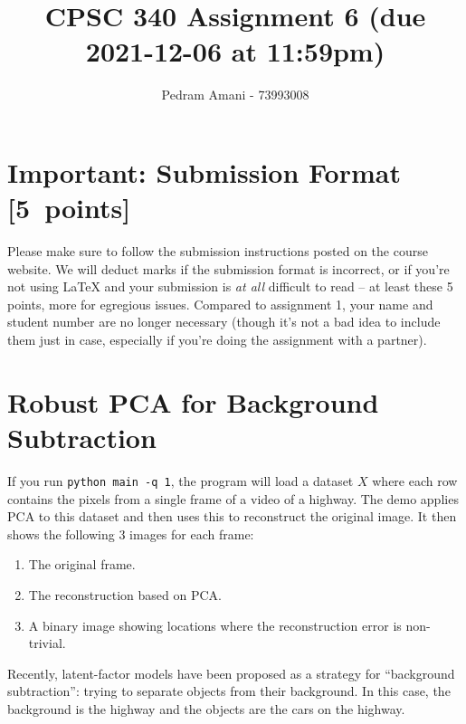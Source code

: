 \documentclass{article}
\newcommand{\blu}[1]{{\textcolor{blu}{#1}}}
\let\ask\blu
\newcommand\pts[1]{\textcolor{pointscolour}{[#1~points]}}
\begin{document}
\title{CPSC 340 Assignment 6 (due 2021-12-06 at 11:59pm)}
\date{}
\author{Pedram Amani - 73993008}
\maketitle

\section*{Important: Submission Format \pts{5}}

Please make sure to follow the submission instructions posted on the course website.
\ask{We will deduct marks if the submission format is incorrect, or if you're not using \LaTeX{} and your submission is \emph{at all} difficult to read} -- at least these 5 points, more for egregious issues.
Compared to assignment 1, your name and student number are no longer necessary (though it's not a bad idea to include them just in case, especially if you're doing the assignment with a partner).

\vspace{1em}

\section{Robust PCA for Background Subtraction}

If you run \verb|python main -q 1|, the program will load a dataset $X$ where each row contains the pixels from a single frame of a video of a highway. The demo applies PCA to this dataset and then uses this to reconstruct the original image.
It then shows the following 3 images for each frame:
\begin{enumerate}
    \item The original frame.
    \item The reconstruction based on PCA.
    \item A binary image showing locations where the reconstruction error is non-trivial.
\end{enumerate}
Recently, latent-factor models have been proposed as a strategy for ``background subtraction'': trying to separate objects from their background. In this case, the background is the highway and the objects are the cars on the highway.
\end{document}
